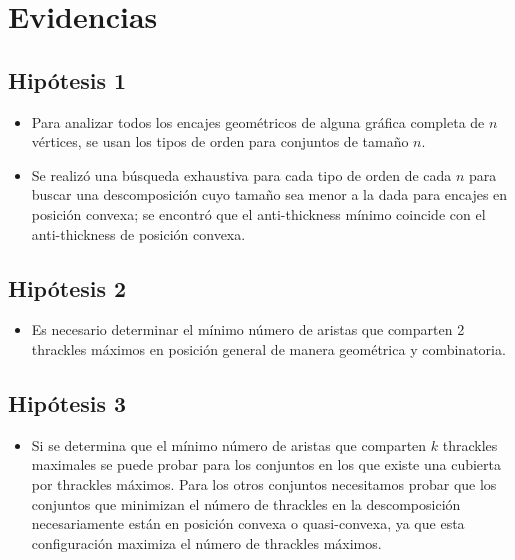 \documentclass[12pt, letterpaper]{article}
\begin{document}
\section{Evidencias}
\subsection{Hipótesis 1}
\begin{itemize}
  \item Para analizar todos los encajes geométricos de alguna gráfica completa
  de $n$ vértices, se usan los tipos de orden para conjuntos de tamaño $n$.
  \item Se realizó una búsqueda exhaustiva para cada tipo de orden de cada $n$
  para buscar una descomposición cuyo tamaño sea menor a la dada para encajes
  en posición convexa; se encontró que el anti-thickness mínimo coincide con el
  anti-thickness de posición convexa.
\end{itemize}
\subsection{Hipótesis 2}
\begin{itemize}
  \item Es necesario determinar el mínimo número de aristas que
  comparten 2 thrackles máximos en posición general de manera geométrica y combinatoria.
\end{itemize}
\subsection{Hipótesis 3}
\begin{itemize}
  \item Si se determina que el mínimo número de aristas que comparten $k$ thrackles maximales se puede probar para los conjuntos en los que existe
  una cubierta por thrackles máximos. Para los otros conjuntos
  necesitamos probar que los conjuntos que minimizan el número de thrackles
  en la descomposición necesariamente están en posición convexa o quasi-convexa, ya que esta configuración maximiza
  el número de thrackles máximos.
\end{itemize}
\end{document}

